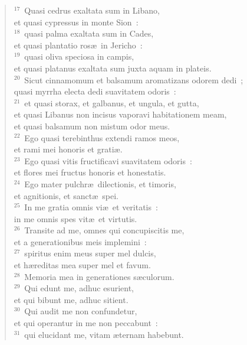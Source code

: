 \begin{verse}${}^{17}$~Quasi cedrus exaltata sum in Libano,\\ et quasi cypressus in monte Sion~:\\
${}^{18}$~quasi palma exaltata sum in Cades,\\ et quasi plantatio ros\ae\ in Jericho~:\\
${}^{19}$~quasi oliva speciosa in campis,\\ et quasi platanus exaltata sum juxta aquam in plateis.\\
${}^{20}$~Sicut cinnamomum et balsamum aromatizans odorem dedi~;\\ quasi myrrha electa dedi suavitatem odoris~:\\
${}^{21}$~et quasi storax, et galbanus, et ungula, et gutta,\\ et quasi Libanus non incisus vaporavi habitationem meam,\\ et quasi balsamum non mistum odor meus.\\
${}^{22}$~Ego quasi terebinthus extendi ramos meos,\\ et rami mei honoris et grati\ae .\\
${}^{23}$~Ego quasi vitis fructificavi suavitatem odoris~:\\ et flores mei fructus honoris et honestatis.\\
${}^{24}$~Ego mater pulchr\ae\ dilectionis, et timoris,\\ et agnitionis, et sanct\ae\ spei.\\
${}^{25}$~In me gratia omnis vi\ae\ et veritatis~:\\ in me omnis spes vit\ae\ et virtutis.\\
${}^{26}$~Transite ad me, omnes qui concupiscitis me,\\ et a generationibus meis implemini~:\\
${}^{27}$~spiritus enim meus super mel dulcis,\\ et h\ae reditas mea super mel et favum.\\
${}^{28}$~Memoria mea in generationes s\ae culorum.\\
${}^{29}$~Qui edunt me, adhuc esurient,\\ et qui bibunt me, adhuc sitient.\\
${}^{30}$~Qui audit me non confundetur,\\ et qui operantur in me non peccabunt~:\\
${}^{31}$~qui elucidant me, vitam \ae ternam habebunt.\end{verse}


